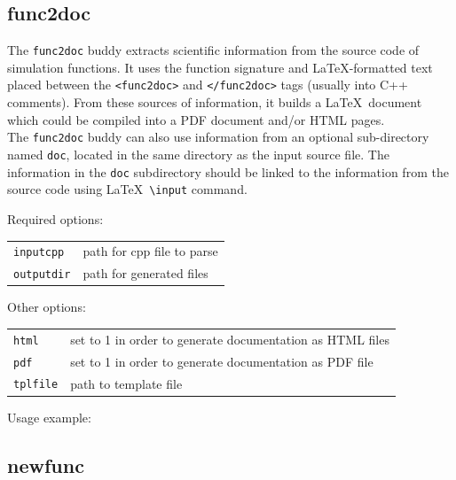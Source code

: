 \subsection{func2doc}

The \texttt{func2doc} buddy extracts scientific information from the source code of simulation functions. It uses the function signature and \LaTeX-formatted text placed between the \texttt{<func2doc>} and \texttt{</func2doc>} tags (usually into C++ comments). From these sources of information, it builds a \LaTeX\ document which could be compiled into a PDF document and/or HTML pages.\\
The \texttt{func2doc} buddy can also use information from an optional sub-directory named \texttt{doc}, located in the same directory as the input source file. The information in the \texttt{doc} subdirectory should be linked to the information from the source code using \LaTeX\ \texttt{\textbackslash input} command.  

\bigskip

\noindent Required options:
\begin{center}
\begin{tabularx}{\linewidth}{lX}
\texttt{inputcpp}&path for cpp file to parse\\
\texttt{outputdir}&path for generated files\\
\end{tabularx}
\end{center}

\noindent Other options:
\begin{center}
\begin{tabularx}{\linewidth}{lX}
\texttt{html}&set to 1 in order to generate documentation as HTML files\\
\texttt{pdf}&set to 1 in order to generate documentation as PDF file\\
\texttt{tplfile}&path to template file\\
\end{tabularx}
\end{center}

\bigskip

\noindent Usage example:\\


\subsection{newfunc}

